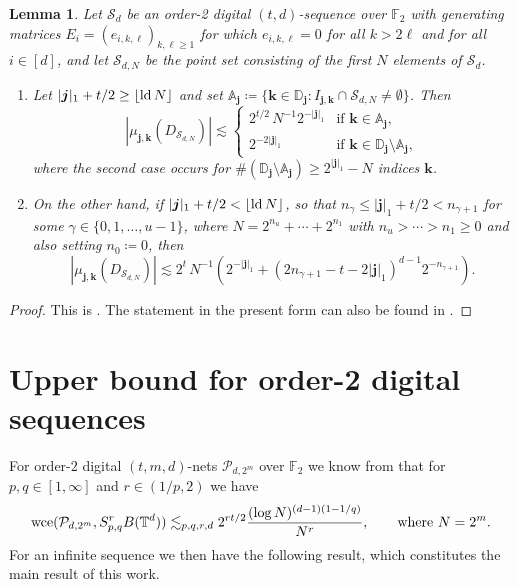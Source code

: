 \documentclass[12pt, a4paper]{article}
\newtheorem{lem}[thm]{Lemma}
\def\P{\mathcal{P}}
\def\S{\mathcal{S}}
\newcommand{\ld}{{\rm ld}\,}
\newcommand{\wce}{{\rm wce}}
\newcommand{\bsj}{{\boldsymbol{j}}}
\newcommand{\bsk}{{\boldsymbol{k}}}
\newcommand{\bbT}{{\mathbb{T}}}
\newcommand{\bbD}{{\mathbb{D}}}
\newcommand{\bbA}{{\mathbb{A}}}
\newcommand{\FF}{{\mathbb{F}}} %
\begin{document}
\begin{lem}\label{le131416}
Let $\S_d$ be an order-2 digital $(t,d)$-sequence over $\mathbb{F}_2$ with generating matrices $E_i=(e_{i,k,\ell})_{k,\ell \ge 1}$ for which $e_{i,k,\ell}=0$ for all $k > 2\ell$ and for all $i\in [d]$, and let $\S_{d, N}$ be the point set consisting of the first $N$ elements of $\S_d$. 
\begin{enumerate}
\item Let $|\bsj|_1+t/2\geq \lfloor \ld N \rfloor$ and set $\bbA_\bsj \coloneqq \{\bsk \in \bbD_\bsj: I_{\bsj, \bsk} \cap \S_{d, N} \neq \emptyset\}$. %
Then
$$
|\mu_{\bsj,\bsk}(D_{\S_{d,N}})| \lesssim  \begin{cases}
    2^{t/2}\,N^{-1} 2^{-|\bsj|_1} & \text{if } \bsk \in \bbA_\bsj, \\
    2^{-2|\bsj|_1} & \text{if } \bsk \in \bbD_\bsj \setminus \bbA_\bsj,
\end{cases}
$$
where the second case occurs for $\#(\bbD_\bsj \setminus \bbA_\bsj) \geq 2^{|\bsj|_1} - N$ indices $\bsk$.
\item On the other hand, if $|\bsj|_1+t/2< \lfloor \ld N \rfloor$, so that $n_\gamma \le |\bsj|_1+t/2< n_{\gamma+1}$ for some $\gamma \in \{0, 1, \dots, u-1\}$, where $N=2^{n_u}+\cdots+2^{n_1}$ with $n_u > \cdots >n_1 \ge 0$ and also setting $n_0 \coloneqq 0$, then 
\[
|\mu_{\bsj,\bsk}(D_{\S_{d,N}})| \lesssim 2^t\,N^{-1} \left(2^{-|\bsj|_1} +  (2n_{\gamma+1} - t - 2|\bsj|_1)^{d-1}2^{-n_{\gamma+1}}\right).
\]
\end{enumerate}
\end{lem}

\begin{proof}
This is \cite[Equations (13), (14), and (16)]{DHMP16}. The statement in the present form can also be found in \cite[Lemma~4.5]{DHMP}.
\end{proof}

\section{Upper bound for order-2 digital sequences}\label{sec:main}

For order-$2$ digital $(t,m,d)$-nets $\P_{d,2^m}$ over $\FF_2$ we know from \cite[Theorem~5.3]{HMOU} that for $p,q \in [1,\infty]$ and $r \in (1/p,2)$ we have 
$$
\wce(\P_{d,2^m}, S^r_{p, q}B(\bbT^d)) \lesssim_{p,q,r,d} 2^{rt/2} \frac{(\log N)^{(d-1)(1-1/q)}}{N^r},\qquad \mbox{where}\ N=2^m.
$$
For an infinite sequence we then have the following result, which constitutes the main result of this work. 
\end{document}
